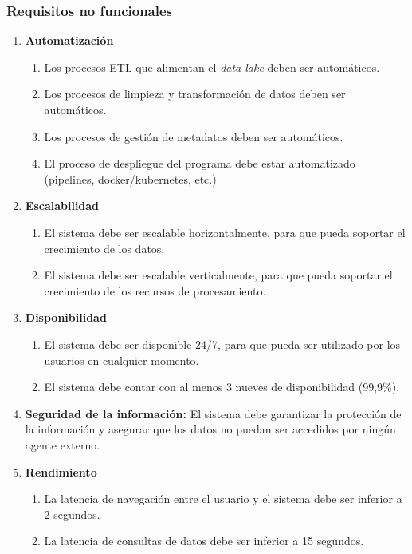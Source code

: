 \subsubsection{Requisitos no funcionales}\label{subsubsec:nofuncionales}
\begin{enumerate}[label=RNF\arabic*.]
	\item \textbf{Automatización} \begin{enumerate}[label*=\arabic*.]
		\item Los procesos ETL que alimentan el \textit{data lake} deben ser automáticos.
		\item Los procesos de limpieza y transformación de datos deben ser automáticos.
		\item Los procesos de gestión de metadatos deben ser automáticos.
		\item El proceso de despliegue del programa debe estar automatizado (pipelines, docker/kubernetes, etc.)
	\end{enumerate}
	\item \textbf{Escalabilidad} \begin{enumerate}[label*=\arabic*.]
		\item El sistema debe ser escalable horizontalmente, para que pueda soportar el crecimiento de los datos.
		\item El sistema debe ser escalable verticalmente, para que pueda soportar el crecimiento de los recursos de procesamiento.
	\end{enumerate}
	\item \textbf{Disponibilidad} \begin{enumerate}[label*=\arabic*.]
		\item El sistema debe ser disponible 24/7, para que pueda ser utilizado por los usuarios en cualquier momento.
		\item El sistema debe contar con al menos 3 nueves de disponibilidad (99,9\%).
	\end{enumerate}
	\item \textbf{Seguridad de la información:} El sistema debe garantizar la protección de la información y asegurar que los datos
		no puedan ser accedidos por ningún agente externo.
	\item \textbf{Rendimiento} \begin{enumerate}[label*=\arabic*.]
		\item La latencia de navegación entre el usuario y el sistema debe ser inferior a 2 segundos.
		\item La latencia de consultas de datos debe ser inferior a 15 segundos.

\end{enumerate}
\end{enumerate}
